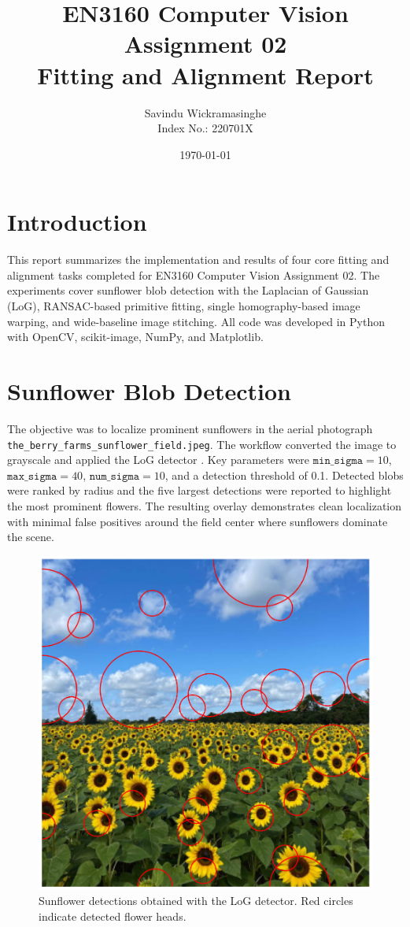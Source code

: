 ﻿\documentclass[11pt,a4paper]{article}
\title{EN3160 Computer Vision Assignment 02\\Fitting and Alignment Report}
\author{Savindu Wickramasinghe \\ Index No.: 220701X}
\date{\today}
\begin{document}
\maketitle

\section{Introduction}
This report summarizes the implementation and results of four core fitting and alignment tasks completed for EN3160 Computer Vision Assignment 02. The experiments cover sunflower blob detection with the Laplacian of Gaussian (LoG), RANSAC-based primitive fitting, single homography-based image warping, and wide-baseline image stitching. All code was developed in Python with OpenCV, scikit-image, NumPy, and Matplotlib.

\section{Sunflower Blob Detection}
The objective was to localize prominent sunflowers in the aerial photograph \texttt{the\_berry\_farms\_sunflower\_field.jpeg}. The workflow converted the image to grayscale and applied the LoG detector \cite{lindeberg1994scale}. Key parameters were \(\texttt{min\_sigma} = 10\), \(\texttt{max\_sigma} = 40\), \(\texttt{num\_sigma} = 10\), and a detection threshold of 0.1. Detected blobs were ranked by radius and the five largest detections were reported to highlight the most prominent flowers. The resulting overlay demonstrates clean localization with minimal false positives around the field center where sunflowers dominate the scene.

\begin{figure}[H]
  \centering
  \includegraphics[width=0.85\linewidth]{sunflower_detection.png}
  \caption{Sunflower detections obtained with the LoG detector. Red circles indicate detected flower heads.}
  \label{fig:sunflower}
\end{figure}
\end{document}
